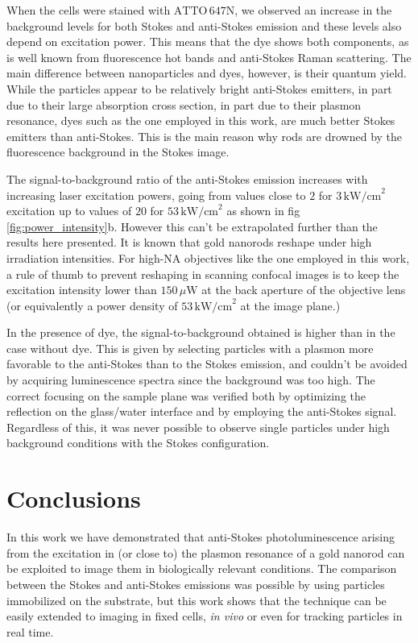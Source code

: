 \documentclass[journal=nalefd,manuscript=letter]{achemso}
\newcommand{\uW}{\ensuremath{\,\mu\textrm{W}}}
\newcommand{\pwr}{\ensuremath{\,\textrm{kW/cm}^2}}
\newcommand{\atto}{\ensuremath{\textrm{ATTO}\,647\textrm{N}}}
\begin{document}
When the cells were stained with \atto, we observed an increase in the
background levels for both Stokes and anti-Stokes emission and these levels also
depend on excitation power. This means that the dye shows both
components, as is well known from fluorescence hot bands and anti-Stokes Raman
scattering. The main difference between nanoparticles and dyes, however, is
their quantum yield. While the particles appear to be relatively bright
anti-Stokes emitters, in part due to their large absorption cross section, in
part due to their plasmon resonance, dyes such as the one employed in this work,
are much better Stokes emitters than anti-Stokes. This is the main reason why
rods are drowned by the fluorescence background in the Stokes image.

The signal-to-background ratio of the anti-Stokes emission increases with
increasing laser excitation powers, going from values close to $2$ for $3\pwr$
excitation up to values of $20$ for $53\pwr$ as shown in fig
\ref{fig:power_intensity}b. However this can't be extrapolated further than the
results here presented. It is known that gold nanorods reshape under high
irradiation intensities\cite{Liu2009}. For high-NA objectives like the one
employed in this work, a rule of thumb to prevent reshaping in scanning confocal images is to
keep the excitation intensity lower than $150\uW$ at the back aperture of the
objective lens (or equivalently a power density of $53\pwr$ at the image
plane.)

In the presence of dye, the signal-to-background obtained is higher than in the
case without dye. This is given by selecting particles with a plasmon more
favorable to the anti-Stokes than to the Stokes emission, and couldn't be
avoided by acquiring luminescence spectra since the background was too high. The
correct focusing on the sample plane was verified both by optimizing the
reflection on the glass/water interface and by employing the anti-Stokes signal.
Regardless of this, it was never possible to observe single particles under high
background conditions with the Stokes configuration.

\section{Conclusions}
In this work we have demonstrated that anti-Stokes photoluminescence arising
from the excitation in (or close to) the plasmon resonance of a gold nanorod can be
exploited to image them in biologically relevant conditions\cite{Jiang2013}. The
comparison between the Stokes and anti-Stokes emissions was possible by using
particles immobilized on the substrate, but this work shows that the technique
can be easily extended to imaging in fixed cells, \textit{in vivo} or even for
tracking particles in real time\cite{VandenBroek2013}.
\end{document}
